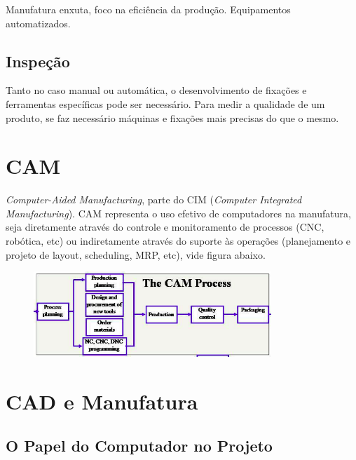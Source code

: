 \documentclass[a4paper]{report}
\begin{document}
Manufatura enxuta, foco na eficiência da produção. Equipamentos automatizados.

\subsection*{Inspeção}

Tanto no caso manual ou automática, o desenvolvimento de fixações e ferramentas específicas pode ser necessário. Para medir a qualidade de um produto, se faz necessário máquinas e fixações mais precisas do que o mesmo.

\section*{CAM}

\emph{Computer-Aided Manufacturing}, parte do CIM (\emph{Computer Integrated Manufacturing}). CAM representa o uso efetivo de computadores na manufatura, seja diretamente através do controle e monitoramento de processos (CNC, robótica, etc) ou indiretamente através do suporte às operações (planejamento e projeto de layout, scheduling, MRP, etc), vide figura abaixo.
 \begin{figure}[H]
    \centering
    \includegraphics[width=0.8\textwidth]{cam_process.png}
\end{figure}

\section*{CAD e Manufatura}

\subsection*{O Papel do Computador no Projeto}
\end{document}
